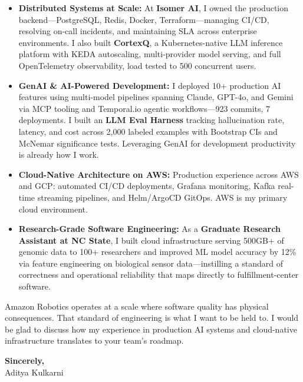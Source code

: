 \documentclass[11pt,letterpaper]{article}
\begin{document}
\begin{itemize}[leftmargin=*, itemsep=6pt, label={\color{AmazonOrange}\faAngleRight}]
    \item \textbf{Distributed Systems at Scale:} At \textbf{Isomer AI}, I owned the production backend---PostgreSQL, Redis, Docker, Terraform---managing CI/CD, resolving on-call incidents, and maintaining SLA across enterprise environments. I also built \textbf{CortexQ}, a Kubernetes-native LLM inference platform with KEDA autoscaling, multi-provider model serving, and full OpenTelemetry observability, load tested to 500 concurrent users.

    \item \textbf{GenAI \& AI-Powered Development:} I deployed 10+ production AI features using multi-model pipelines spanning Claude, GPT-4o, and Gemini via MCP tooling and Temporal.io agentic workflows---923 commits, 7 deployments. I built an \textbf{LLM Eval Harness} tracking hallucination rate, latency, and cost across 2,000 labeled examples with Bootstrap CIs and McNemar significance tests. Leveraging GenAI for development productivity is already how I work.

    \item \textbf{Cloud-Native Architecture on AWS:} Production experience across AWS and GCP: automated CI/CD deployments, Grafana monitoring, Kafka real-time streaming pipelines, and Helm/ArgoCD GitOps. AWS is my primary cloud environment.

    \item \textbf{Research-Grade Software Engineering:} As a \textbf{Graduate Research Assistant at NC State}, I built cloud infrastructure serving 500GB+ of genomic data to 100+ researchers and improved ML model accuracy by 12\% via feature engineering on biological sensor data---instilling a standard of correctness and operational reliability that maps directly to fulfillment-center software.
\end{itemize}

\vspace{6pt}

Amazon Robotics operates at a scale where software quality has physical consequences. That standard of engineering is what I want to be held to. I would be glad to discuss how my experience in production AI systems and cloud-native infrastructure translates to your team's roadmap.

\vspace{12pt}

\textbf{Sincerely,}\\[8pt]
Aditya Kulkarni
\end{document}
